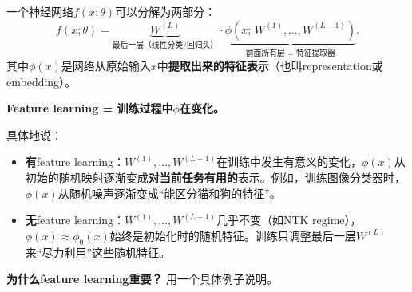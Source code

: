 \documentclass[11pt,a4paper]{article}
\begin{document}
\begin{keyinsight}

一个神经网络$f(x;\theta)$可以分解为两部分：
\[
f(x;\theta) = \underbrace{W^{(L)}}_{\text{最后一层（线性分类/回归头）}} \cdot \underbrace{\phi(x;\, W^{(1)},\dots,W^{(L-1)})}_{\text{前面所有层 = 特征提取器}}.
\]
其中$\phi(x)$是网络从原始输入$x$中\textbf{提取出来的特征表示}（也叫representation或embedding）。

\textbf{Feature learning = 训练过程中$\phi$在变化。}

具体地说：
\begin{itemize}[leftmargin=*]
\item \textbf{有}feature learning：$W^{(1)},\dots,W^{(L-1)}$在训练中发生有意义的变化，$\phi(x)$从初始的随机映射逐渐变成\textbf{对当前任务有用的}表示。例如，训练图像分类器时，$\phi(x)$从随机噪声逐渐变成``能区分猫和狗的特征''。
\item \textbf{无}feature learning：$W^{(1)},\dots,W^{(L-1)}$几乎不变（如NTK regime），$\phi(x)\approx\phi_0(x)$始终是初始化时的随机特征。训练只调整最后一层$W^{(L)}$来``尽力利用''这些随机特征。
\end{itemize}
\end{keyinsight}

\textbf{为什么feature learning重要？} 用一个具体例子说明。
\end{document}
